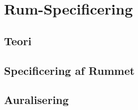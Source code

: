 \chapter{Rum-Specificering}

\section{Teori}
\section{Specificering af Rummet}
\section{Auralisering}